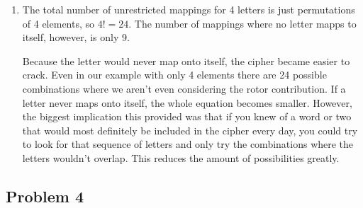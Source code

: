 \documentclass[a4paper,10pt]{article}
\begin{document}
\begin{enumerate}[label= (\alph*)]
 \item The total number of unrestricted mappings for 4 letters is just permutations of 4 elements, so $4! = 24$. The number of mappings where no letter mapps to itself, however, is only 9.
 
 Because the letter would never map onto itself, the cipher became easier to crack. Even in our example with only 4 elements there are 24 possible combinations where we aren't even considering the rotor contribution. If a letter never maps onto itself, the whole equation becomes smaller. However, the biggest implication this provided was that if you knew of a word or two that would most definitely be included in the cipher every day, you could try to look for that sequence of letters and only try the combinations where the letters wouldn't overlap. This reduces the amount of possibilities greatly.

\end{enumerate}

\subsection*{Problem 4}
 
\end{document}
